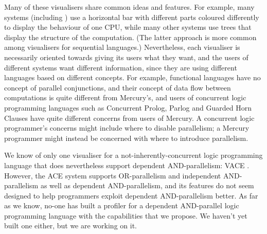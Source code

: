 Many of these visualisers share common ideas and features.
For example, many systems (including \tscope)
use a horizontal bar with different parts coloured differently
to display the behaviour of one CPU,
while many other systems use trees
that display the structure of the computation.
(The latter approach is more common
among visualisers for sequential languages.)
Nevertheless, each visualiser is necessarily oriented
towards giving its users what they want,
and the users of different systems want different information,
since they are using different languages based on different concepts.
For example, functional languages have no concept of parallel conjunctions,
and their concept of data flow between computations
is quite different from Mercury's,
and users of concurrent logic programming languages
such as Concurrent Prolog, Parlog and Guarded Horn Clauses
have quite different concerns from users of Mercury.
A concurrent logic programmer's concerns might include
where to disable parallelism;
a Mercury programmer might instead be concerned with
where to introduce parallelism.

We know of only one visualiser
for a not-inherently-concurrent logic programming language
that does nevertheless support dependent AND-parallelism: VACE \citep{vace}.
However, the ACE system supports
OR-parallelism and independent AND-parallelism
as well as dependent AND-parallelism,
and its features do not seem designed
to help programmers exploit dependent AND-parallelism better.
As far as we know, no-one has built a profiler
for a dependent AND-parallel logic programming language
with the capabilities that we propose.
We haven't yet built one either,
but we are working on it.




